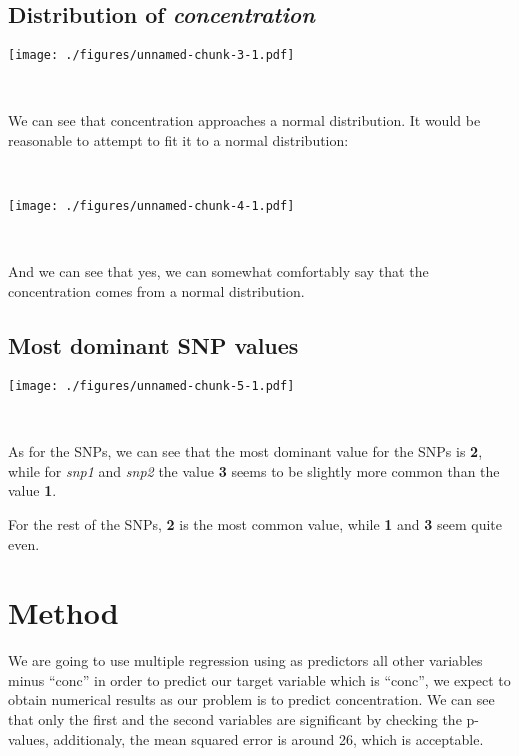 \documentclass[]{article}
\begin{document}
\hypertarget{distribution-of-concentration}{%
\subsection{\texorpdfstring{Distribution of
\emph{concentration}}{Distribution of concentration}}\label{distribution-of-concentration}}

\texttt{[image: ./figures/unnamed-chunk-3-1.pdf]}

~

We can see that concentration approaches a normal distribution. It would
be reasonable to attempt to fit it to a normal distribution:

~

\texttt{[image: ./figures/unnamed-chunk-4-1.pdf]}

~

And we can see that yes, we can somewhat comfortably say that the
concentration comes from a normal distribution.

\hypertarget{most-dominant-snp-values}{%
\subsection{Most dominant SNP values}\label{most-dominant-snp-values}}

\texttt{[image: ./figures/unnamed-chunk-5-1.pdf]}

~

As for the SNPs, we can see that the most dominant value for the SNPs is
\textbf{2}, while for \emph{snp1} and \emph{snp2} the value \textbf{3}
seems to be slightly more common than the value \textbf{1}.

For the rest of the SNPs, \textbf{2} is the most common value, while
\textbf{1} and \textbf{3} seem quite even.

\newpage

\hypertarget{method}{%
\section{Method}\label{method}}

We are going to use multiple regression using as predictors all other
variables minus ``conc'' in order to predict our target variable which
is ``conc'', we expect to obtain numerical results as our problem is to
predict concentration. We can see that only the first and the second
variables are significant by checking the p-values, additionaly, the
mean squared error is around 26, which is acceptable.
\end{document}
